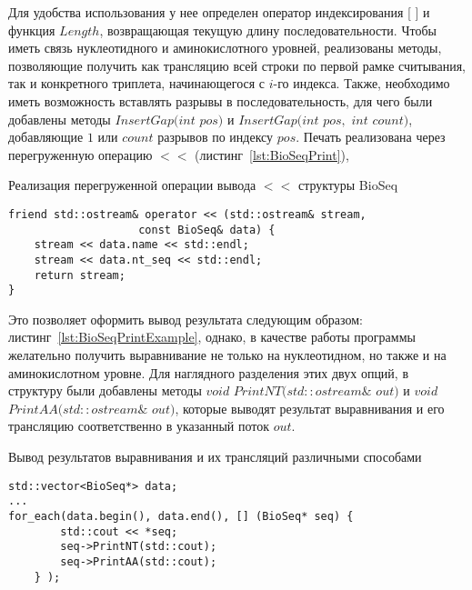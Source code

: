 Для удобства использования у нее определен оператор индексирования [ ] и функция $Length$, возвращающая текущую длину последовательности. Чтобы иметь связь нуклеотидного и аминокислотного уровней, реализованы методы, позволяющие получить как трансляцию всей строки по первой рамке считывания, так и конкретного триплета, начинающегося с $i$-го индекса. Также, необходимо иметь возможность вставлять разрывы в последовательность, для чего были добавлены методы $InsertGap(int$ $pos)$ и $InsertGap(int$ $pos,$ $int$ $count)$, добавляющие $1$ или $count$ разрывов по индексу $pos$. Печать реализована через перегруженную операцию $<<$ (листинг~\ref{lst:BioSeqPrint}),
\begin{algorithm}
	\caption{Реализация перегруженной операции вывода $<<$ структуры BioSeq} \label{lst:BioSeqPrint}
	\begin{lstlisting}
friend std::ostream& operator << (std::ostream& stream, 
					const BioSeq& data) {
	stream << data.name << std::endl;
	stream << data.nt_seq << std::endl;
	return stream;
}
	\end{lstlisting}
\end{algorithm}

Это позволяет оформить вывод результата следующим образом: листинг~\ref{lst:BioSeqPrintExample}, однако, в качестве работы программы желательно получить выравнивание не только на нуклеотидном, но также и на аминокислотном уровне. Для наглядного разделения этих двух опций, в структуру были добавлены методы $void$ $PrintNT(std::ostream\&$ $out)$ и $void$ $PrintAA(std::ostream\&$ $out)$, которые выводят результат выравнивания и его трансляцию соответственно в указанный поток $out$.
\begin{algorithm}
	\caption{Вывод результатов выравнивания и их трансляций различными способами} \label{lst:BioSeqPrintExample}
	\begin{lstlisting}
std::vector<BioSeq*> data; 
...
for_each(data.begin(), data.end(), [] (BioSeq* seq) { 
		std::cout << *seq; 
		seq->PrintNT(std::cout);
		seq->PrintAA(std::cout);
	} );
	\end{lstlisting}
\end{algorithm}



